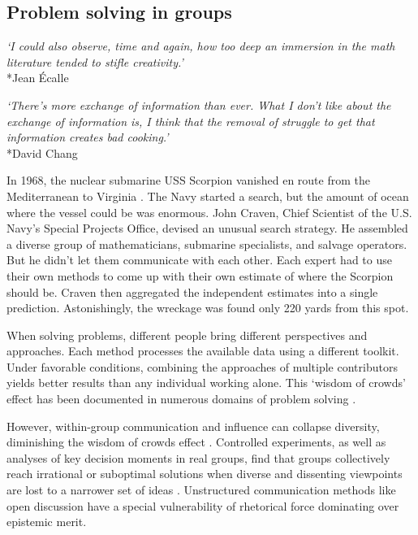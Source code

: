 \documentclass[12pt]{article}
\begin{document}
\subsection{Problem solving in groups}

\begin{center}
\textit{`I could also observe, time and again, how too deep an immersion in the math literature tended to stifle creativity.'}\\*Jean Écalle
\end{center}

\begin{center}
\textit{`There's more exchange of information than ever. What I don't like about the exchange of information is, I think that the removal of struggle to get that information creates bad cooking.'}\\*David Chang
\end{center}

In 1968, the nuclear submarine USS Scorpion vanished en route from the Mediterranean to Virginia \citep{sontag1998blind, craven2002silent, surowiecki2005wisdom}. The Navy started a search, but the amount of ocean where the vessel could be was enormous. John Craven, Chief Scientist of the U.S. Navy's Special Projects Office, devised an unusual search strategy. He assembled a diverse group of mathematicians, submarine specialists, and salvage operators. But he didn't let them communicate with each other. Each expert had to use their own methods to come up with their own estimate of where the Scorpion should be. Craven then aggregated the independent estimates into a single prediction. Astonishingly, the wreckage was found only 220 yards from this spot. 

When solving problems, different people bring different perspectives and approaches. Each method processes the available data using a different toolkit. Under favorable conditions, combining the approaches of multiple contributors yields better results than any individual working alone. This `wisdom of crowds' effect has been documented in numerous domains of problem solving \citep{surowiecki2005wisdom, condorcet1785essai}.

However, within-group communication and influence can collapse diversity, diminishing the wisdom of crowds effect \citep{surowiecki2005wisdom, hogarth1978note, ladha1992condorcet, hong2004groups}. Controlled experiments, as well as analyses of key decision moments in real groups, find that groups collectively reach irrational or suboptimal solutions when diverse and dissenting viewpoints are lost to a narrower set of ideas \citep{anderson1997information, stasser1985pooling, flowers1977laboratory, becker2017network, janis1972victims, bernstein2018intermittent, diehl1987productivity, frey2021social}. Unstructured communication methods like open discussion have a special vulnerability of rhetorical force dominating over epistemic merit. 
\end{document}
